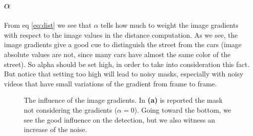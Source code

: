 \subsection*{$\alpha$}
From eq \ref{eq:dist} we see that $\alpha$ tells how much to weight the image gradients
with respect to the image values in the distance computation.
As we see, the image gradients give a good cue to distinguish the street from the cars
(image absolute values are not, since many cars have almost the same color of the
street). So alpha should be set high, in order to take into consideration this fact.
But notice that setting too high will lead to noisy masks, especially with noisy
videos that have small variations of the gradient from frame to frame.
\begin{figure}[!t]
    \centering
    \newline
    \newline
    \newline
    \caption{The influence of the image gradients. In \textbf{(a)} is reported the mask not considering the gradients ($\alpha = 0$). Going toward the bottom, we see the good influence on the detection, but we also witness an increase of the noise.}
\end{figure}

